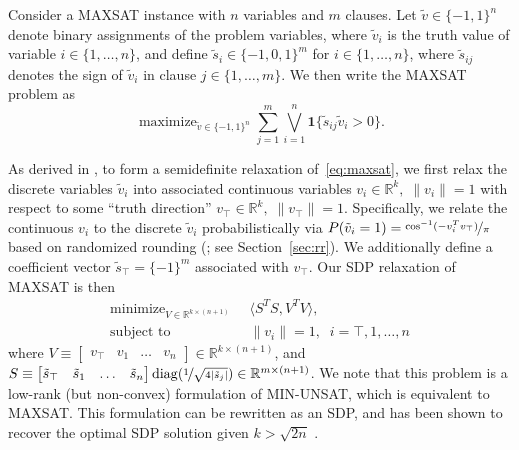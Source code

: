 \documentclass{article}
\DeclareMathOperator*{\minimize}{minimize}
\DeclareMathOperator*{\maximize}{maximize}
\DeclareMathOperator{\diag}{diag}
\def\subjectto{\mbox{subject to}}
\newcommand{\norm}[1] {\|#1\|}
\newcommand{\mdot}[2]{\langle#1,#2\rangle}
\newcommand{\truthvar}{\top}
\begin{document}
	Consider a MAXSAT instance with $n$ variables and $m$ clauses.
	Let $\tilde{v} \in \{-1, 1\}^{n}$ denote binary assignments of the problem variables, where $\tilde{v}_i$ is the truth value of variable $i \in \{1, \ldots, n\}$, and define $\tilde{s}_i \in \{-1, 0, 1\}^m$ for $i \in \{1, \ldots, n\}$, where $\tilde{s}_{ij}$ denotes the sign of $\tilde{v}_i$ in clause $j \in \{1, \ldots, m \}$.
	We then write the MAXSAT problem as
	\begin{equation}
		\label{eq:maxsat}
		\maximize_{\tilde{v} \in \{-1, 1\}^n} \sum_{j=1}^m \bigvee_{i=1}^n \mathbf{1} \{\tilde{s}_{ij} 
		\tilde{v}_i > 0 \}.
	\end{equation}
	
	As derived in \citet{goemans1995improved, wang2018low}, 
to form a semidefinite relaxation of~\eqref{eq:maxsat}, we first relax the discrete variables $\tilde{v}_i$ into associated continuous variables $v_i \in \mathbb{R}^k, \; \| v_i \| = 1$ with respect to some ``truth direction'' $v_{\truthvar} \in \mathbb{R}^k, \; \|v_{\truthvar}\| = 1$.
	Specifically, we relate the continuous $v_i$ to the discrete $\tilde{v}_i$ probabilistically via $ P(\tilde{v}_i = 1) = \nicefrac{\cos^{-1}(-v_i^T v_{\truthvar})}{\pi}$ based on randomized rounding (\citet{goemans1995improved}; see Section~\ref{sec:rr}).
	We additionally define a coefficient vector $\tilde{s}_{\truthvar} = \{-1\}^m$ associated with $v_{\truthvar}$.
	Our SDP relaxation of MAXSAT is then
	\begin{equation}
		\label{eq:sdp}
		\begin{aligned}
			\minimize_{V \in \mathbb{R}^{k \times (n+1)}} \;\;&\mdot{S^T S}{V^T V},\\
			\subjectto\;\; &\norm{v_i}=1,\;\;i= \truthvar, 1,\ldots,n
		\end{aligned}
	\end{equation}
	where $V \equiv \begin{bmatrix} v_{\truthvar} & v_1 & \ldots & v_{n} \end{bmatrix} \in \mathbb{R}^{k \times (n+1)}$, and $S \equiv \begin{bmatrix} \tilde{s}_{\truthvar} & \tilde{s}_1 & \ldots & \tilde{s}_n \end{bmatrix}\diag(\nicefrac{1}{\sqrt{4|\tilde{s}_{j}|}}) \in \mathbb{R}^{m \times (n+1)}$.
	We note that this problem is a low-rank (but non-convex) formulation of MIN-UNSAT, which is equivalent to MAXSAT.
	This formulation can be rewritten as an SDP, and has been shown to recover the optimal SDP solution given $k > \sqrt{2n}$ \cite{barvinok1995problems, pataki1998rank}.
	
\end{document}
